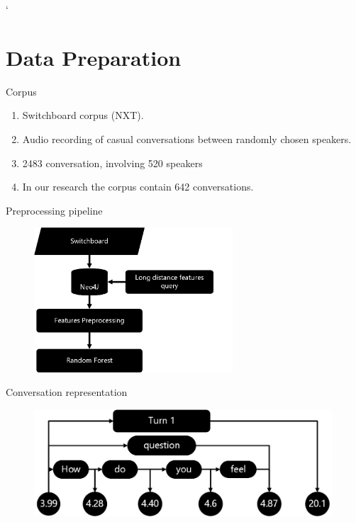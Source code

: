 `%

\section{Data Preparation}
\frame{\sectionpage}


\begin{frame}{Corpus}
    \begin{enumerate}[<+->]\itemsep9pt
      \item Switchboard corpus (NXT).
      \item Audio recording of casual conversations between randomly chosen speakers.
      \item 2483 conversation, involving 520 speakers
      \item In our research the corpus contain 642 conversations.
    \end{enumerate}

\end{frame}{}


\begin{frame}{Preprocessing pipeline}
\begin{figure}[ht!]
\centering
\includegraphics[width=20em]{../latex/pipeline.jpg}\vspace{-1em}
\end{figure}
\end{frame}


\begin{frame}{Conversation representation}
\begin{figure}[ht!]
\centering
\includegraphics[width=30em]{../latex/graph5.jpg}\vspace{-1em}
\end{figure}
\end{frame}



